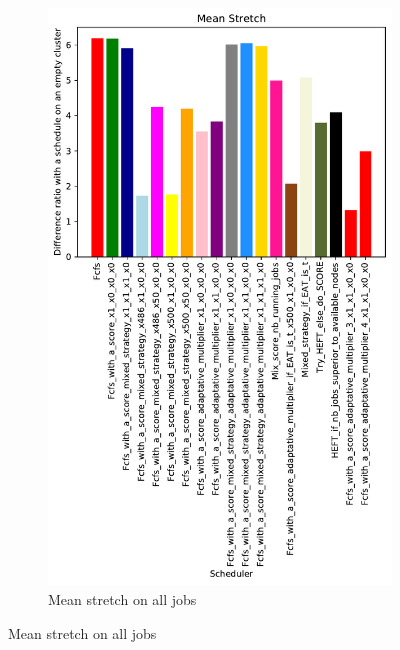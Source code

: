 \documentclass[a4paper]{article}
\begin{document}
\begin{figure}[H]
\begin{subfigure}[b]{0.4\linewidth}\centering\includegraphics[width=0.9\linewidth]{MBSS/plot/Results_FCFS_Score_Adaptative_Multiplier_2022-01-21->2022-01-21_V9271_Mean_Stretch_450_128_32_256_4_1024.pdf}\caption{Mean stretch on all jobs}\end{subfigure}

\end{figure}
\end{document}
